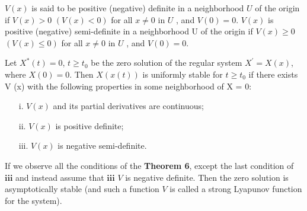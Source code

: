 \begin{theorem}
	$ V (x) $ is said to be positive (negative) definite in a neighborhood $ U $ of the origin if  $ V (x) > 0 $ $ (V (x) < 0) $ for all $ x  \neq 0 $ in $ U $ , and $ V (0) = 0 $. $ V (x) $
	is positive (negative) semi-definite in a neighborhood U of the origin if $ V (x) \geq 0 $
	$ (V (x) \leq 0) $ for all $ x  \neq 0 $ in $ U $ , and $ V (0) = 0 $.
\end{theorem} 
\begin{theorem}
	Let $ X^{*}(t) = 0 $, $ t \geq t_{0} $ be the zero solution of the regular system $ X^{'} = X (x) $, where $ X (0) = 0 $. Then $ X (x(t)) $ is uniformly stable for $ t \geq t_{0} $ if there exists V (x) with the following properties in some neighborhood of X = 0:
	\begin{itemize}
		\item [i.] $ V (x) $ and its partial derivatives are continuous;
		\item [ii.] $ V (x) $ is positive definite;
		\item [iii.] $ V (x) $ is negative semi-definite.
	\end{itemize}
\end{theorem}
\begin{theorem}
	If we observe all the conditions of the \textbf{Theorem 6}, except the last condition of $ \textbf{iii} $ and instead assume that $ \textbf{iii} $ $ V $ is negative definite. Then the zero solution is asymptotically stable (and such a function $ V $ is called a strong Lyapunov function for the system).
\end{theorem}
